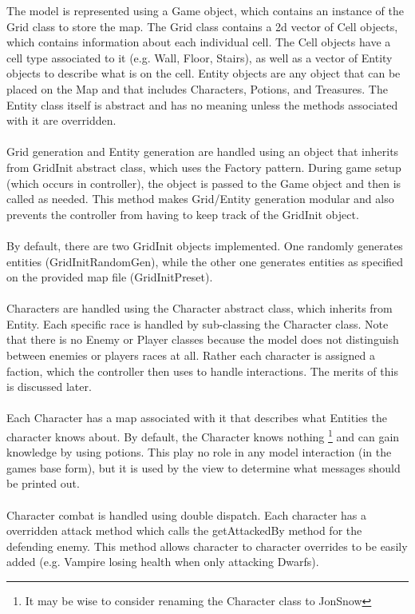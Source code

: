 \documentclass[12pt]{article}
\begin{document}
The model is represented using a Game object, which contains an instance of the Grid class to store the map. The Grid class contains a 2d vector of Cell objects, which contains information about each individual cell. The Cell objects have a cell type associated to it (e.g. Wall, Floor, Stairs), as well as a vector of Entity objects to describe what is on the cell. Entity objects are any object that can be placed on the Map and that includes Characters, Potions, and Treasures. The Entity class itself is abstract and has no meaning unless the methods associated with it are overridden. \\
\\
Grid generation and Entity generation are handled using an object that inherits from GridInit abstract class, which uses the Factory pattern. During game setup (which occurs in controller), the object is passed to the Game object and then is called as needed. This method makes Grid/Entity generation modular and also prevents the controller from having to keep track of the GridInit object.\\
\\
By default, there are two GridInit objects implemented. One randomly generates entities (GridInitRandomGen), while the other one generates entities as specified on the provided map file (GridInitPreset).
\\
\\
Characters are handled using the Character abstract class, which inherits from Entity. Each specific race is handled by sub-classing the Character class. Note that there is no Enemy or Player classes because the model does not distinguish between enemies or players races at all. Rather each character is assigned a faction, which the controller then uses to handle interactions. The merits of this is discussed later. \\
\\
Each Character has a map associated with it that describes what Entities the character knows about. By default, the Character knows nothing \footnote{It may be wise to consider renaming the Character class to JonSnow} and can gain knowledge by using potions. This play no role in any model interaction (in the games base form), but it is used by the view to determine what messages should be printed out. \\
\\
Character combat is handled using double dispatch. Each character has a overridden attack method which calls the getAttackedBy method for the defending enemy. This method allows character to character overrides to be easily added (e.g. Vampire losing health when only attacking Dwarfs). \\
\end{document}
